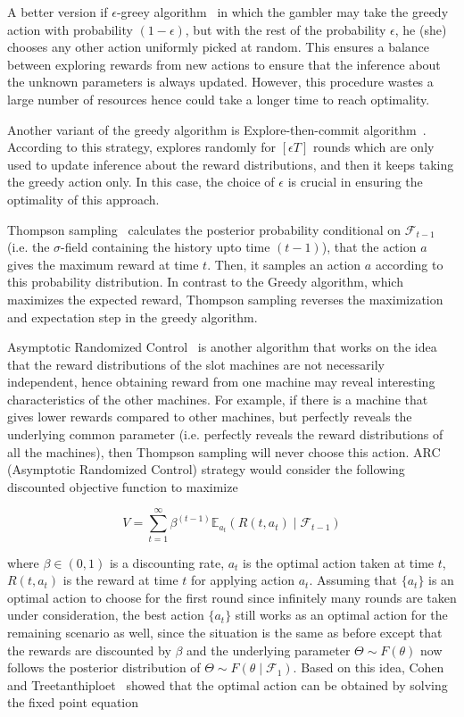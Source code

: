 \documentclass[11pt]{article}
\newcommand{\E}{\mathbb{E}}
\newcommand{\Fcal}{\mathcal{F}}
\begin{document}
A better version if $\epsilon$-greey algorithm~\cite{vermorel2005multi} in which the gambler may take the greedy action with probability $(1 - \epsilon)$, but with the rest of the probability $\epsilon$, he (she) chooses any other action uniformly picked at random. This ensures a balance between exploring rewards from new actions to ensure that the inference about the unknown parameters is always updated. However, this procedure wastes a large number of resources hence could take a longer time to reach optimality. 

Another variant of the greedy algorithm is Explore-then-commit algorithm~\cite{rusmevichientong2010linearly}. According to this strategy, explores randomly for $[\epsilon T]$ rounds which are only used to update inference about the reward distributions, and then it keeps taking the greedy action only. In this case, the choice of $\epsilon$ is crucial in ensuring the optimality of this approach.

Thompson sampling~\cite{thompson1933likelihood} calculates the posterior probability conditional on $\Fcal_{t-1}$ (i.e. the $\sigma$-field containing the history upto time $(t-1)$), that the action $a$ gives the maximum reward at time $t$. Then, it samples an action $a$ according to this probability distribution. In contrast to the Greedy algorithm, which maximizes the expected reward, Thompson sampling reverses the maximization and expectation step in the greedy algorithm.

Asymptotic Randomized Control~\cite{cohen2020asymptotic,treetanthiploet2021correlated} is another algorithm that works on the idea that the reward distributions of the slot machines are not necessarily independent, hence obtaining reward from one machine may reveal interesting characteristics of the other machines. For example, if there is a machine that gives lower rewards compared to other machines, but perfectly reveals the underlying common parameter (i.e. perfectly reveals the reward distributions of all the machines), then Thompson sampling will never choose this action. ARC (Asymptotic Randomized Control) strategy would consider the following discounted objective function to maximize 

$$V = \sum_{t=1}^\infty \beta^{(t-1)}\E_{a_t}(R(t, a_t)\mid \Fcal_{t-1})$$

\noindent where $\beta \in (0, 1)$ is a discounting rate, $a_t$ is the optimal action taken at time $t$, $R(t, a_t)$ is the reward at time $t$ for applying action $a_t$. Assuming that $\{ a_t \}$ is an optimal action to choose for the first round since infinitely many rounds are taken under consideration, the best action $\{ a_t \}$ still works as an optimal action for the remaining scenario as well, since the situation is the same as before except that the rewards are discounted by $\beta$ and the underlying parameter $\Theta \sim F(\theta)$ now follows the posterior distribution of $\Theta \sim F(\theta \mid \Fcal_1)$. Based on this idea, Cohen and Treetanthiploet~\cite{treetanthiploet2021correlated} showed that the optimal action can be obtained by solving the fixed point equation
\end{document}
